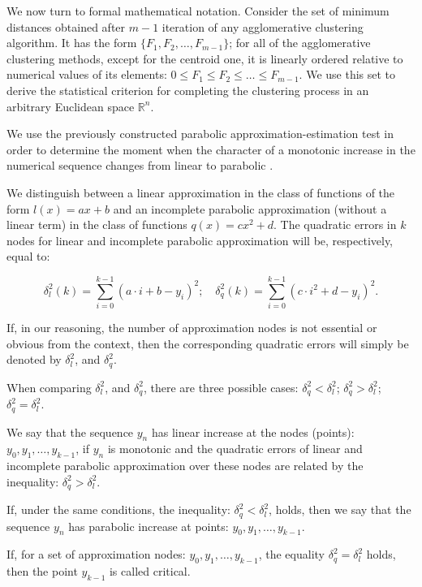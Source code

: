 We now turn to formal mathematical notation. Consider the set of minimum distances obtained
after \(m - 1\) iteration of any agglomerative clustering algorithm. It has the form \( \{F_1, F_2, \ldots, F_{m-1}\} \); for all of the agglomerative clustering methods, except for the centroid one, it is linearly ordered
relative to numerical values of its elements: \( 0 \le F_1 \le F_2 \le \ldots \le F_{m-1} \). We use this set to derive the statistical criterion for completing the clustering process in an arbitrary Euclidean space \(\mathbb{R}^n\).

We use the previously constructed parabolic approximation-estimation test in order to determine the moment when the character of a monotonic increase in the numerical sequence changes from linear
to parabolic \cite{Orekhov201809,Orekhov2018}.

We distinguish between a linear approximation in the class of functions of the form \(l(x) =
ax + b\) and an incomplete parabolic approximation (without a linear term) in the class of functions \(q(x) = cx^2 + d\). The quadratic errors in \(k\) nodes for linear and incomplete parabolic approximation will be, respectively, equal to:

\begin{equation}
	\label{eqn:33}
	\delta_l^2(k) = \sum_{i=0}^{k-1}(a \cdot i + b - y_i)^2; \quad \delta_q^2(k) = \sum_{i=0}^{k-1}(c \cdot i^2 + d - y_i)^2.
\end{equation}

If, in our reasoning, the number of approximation nodes is not essential or obvious from the context, then the corresponding quadratic errors will simply be denoted by \(\delta_l^2\), and \(\delta_q^2\).

When comparing \(\delta_l^2\), and \(\delta_q^2\), there are three possible cases: \(\delta_q^2 < \delta_l^2\); \(\delta_q^2 > \delta_l^2\); \(\delta_q^2 = \delta_l^2\).

We say that the sequence \(y_n\) has linear increase at the nodes (points): \(y_0, y_1, \ldots , y_{k-1}\), if \(y_n\) is monotonic and the quadratic errors of linear and incomplete parabolic approximation over these nodes are related by the inequality: \(\delta_q^2 > \delta_l^2\).

If, under the same conditions, the inequality: \(\delta_q^2 < \delta_l^2\), holds, then we say that the sequence \(y_n\) has parabolic increase at points: \(y_0, y_1, \ldots , y_{k-1}\).

If, for a set of approximation nodes: \(y_0, y_1, \ldots , y_{k-1}\), the equality \(\delta_q^2 = \delta_l^2\) holds, then the point \(y_{k-1}\) is called critical.

